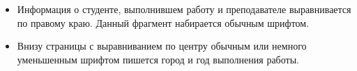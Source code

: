 \documentclass[a4paper,12pt,titlepage,finall]{article}
\begin{document}
\begin{enumerate}
\begin{itemize}
        \begin{itemize}
        \item Наименование работы (<<Отчет по заданию №6>>, без кавычек заглавными
            или малыми заглавными буквами).
        \item Тема работы (<<Сборка многомодульных \dots>>, в кавычках, жирным шрифтом).
        \item Вариант. (Без кавычек жирным шрифтом).
        \end{itemize}
    \item Информация о студенте, выполнившем работу и преподавателе выравнивается
        по правому краю. Данный фрагмент набирается обычным шрифтом.
    \item Внизу страницы с выравниванием по центру обычным или немного уменьшенным
        шрифтом пишется город и год выполнения работы.
    \end{itemize}
\end{enumerate}
\end{document}
